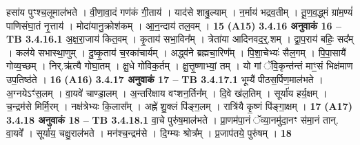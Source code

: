 \documentclass[17pt]{extarticle}
\begin{document}
{{{{{{{{{{{{{{{{{{{                  हसा॑य पुꣳश्च॒लूमाल॑भते । वी॒णा॒वा॒दं गण॑कं गी॒ताय॑ । याद॑से शाबु॒ल्याम् । न॒र्माय॑ भद्रव॒तीम् । तू॒ण॒व॒द्ध्मं ग्रा॑म॒ण्यं॑ पाणिसंघा॒तं नृ॒त्ताय॑ । मोदा॑यानु॒क्रोश॑कम् । आ॒न॒न्दाय॑ तल॒वम् । \textbf{ 15} \newline
                  \newline
                                     \textbf{(A15)} \newline \newline
                \textbf{ 3.4.16    अनुवाकं   16 –} \newline
                                \textbf{ TB 3.4.16.1} \newline
                  अ॒क्ष॒रा॒जाय॑ कित॒वम् । कृ॒ताय॑ सभा॒विन᳚म् । त्रेता॑या आदिनवद॒र्॒.शम् । द्वा॒प॒राय॑ बहिः॒ सद᳚म् । कल॑ये सभास्था॒णुम् । दु॒ष्कृ॒ताय॑ च॒रका॑चार्यम् । अद्ध्व॑ने ब्रह्मचा॒रिण᳚म् । पि॒शा॒चेभ्यः॑ सैल॒गम् । पि॒पा॒सायै॑ गोव्य॒च्छम् । निर्.ऋ॑त्यै गोघा॒तम् । क्षु॒धे गो॑विक॒र्तम् । क्षु॒त्तृ॒ष्णाभ्यां॒ तम् । यो गां ॅवि॒कृन्त॑न्तं माꣳ॒॒सं भिक्ष॑माण उप॒तिष्ठ॑ते । \textbf{ 16} \newline
                  \newline
                                     \textbf{(A16)} \newline \newline
                \textbf{ 3.4.17    अनुवाकं   17 –} \newline
                                \textbf{ TB 3.4.17.1} \newline
                  भूम्यै॑ पीठस॒र्पिण॒माल॑भते । अ॒ग्नयेऽꣳ॑स॒लम् । वा॒यवे॑ चाण्डा॒लम् । अ॒न्तरि॑क्षाय वꣳशन॒र्तिन᳚म् । दि॒वे ख॑ल॒तिम् । सूर्या॑य हर्य॒क्षम् । च॒न्द्रम॑से मिर्मि॒रम् । नक्ष॑त्रेभ्यः कि॒लास᳚म् । अह्ने॑ शु॒क्लं पि॑ङ्ग॒लम् । रात्रि॑यै कृ॒ष्णं पि॑ङ्गा॒क्षम् । \textbf{ 17} \newline
                  \newline
                                     \textbf{(A17)} \newline \newline
                \textbf{ 3.4.18    अनुवाकं   18 –} \newline
                                \textbf{ TB 3.4.18.1} \newline
                  वा॒चे पुरु॑ष॒माल॑भते । प्रा॒णम॑पा॒नं ॅव्या॒नमु॑दा॒नꣳ स॑मा॒नं तान्. वा॒यवे᳚ । सूर्या॑य॒ चक्षु॒राल॑भते । मन॑श्च॒न्द्रम॑से । दि॒ग्म्यः श्रोत्र᳚म् । प्र॒जाप॑तये॒ पुरु॑षम् । \textbf{ 18} \newline
                  \newline
}}}}}}}}}}}}}}}}}}}
\end{document}
